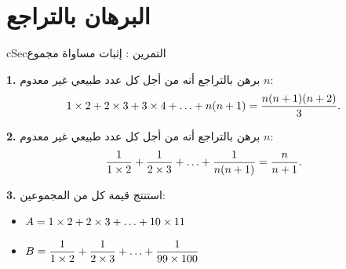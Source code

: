\documentclass[12pt,a4paper]{article}
\newenvironment{BOX}[2]{\begin{otherlanguage}{english}\begin{arbox}{#1}{#2}}{\end{arbox}\end{otherlanguage}}
\newcounter{exo}
\newenvironment{tamrin}[1]{\stepcounter{exo}\begin{BOX}{cSec}{التمرين \theexo: #1}}{\end{BOX}}
\renewcommand{\dots}{\mathinner{\ldotp\ldotp\ldotp}}
\newenvironment{sq}{\begin{itemize}[leftmargin=2.4em,itemsep=3pt]}{\end{itemize}}
\newcommand{\qa}{\item[(أ)]}\newcommand{\qb}{\item[(ب)]}\newcommand{\qc}{\item[(جـ)]}\newcommand{\qd}{\item[(د)]}\newcommand{\qe}{\item[(هـ)]}
\newcommand{\QQ}[1]{\par\smallskip\textbf{#1.} }
\begin{document}
\section{البرهان بالتراجع}

\begin{tamrin}{إثبات مساواة مجموع}
\QQ{1} برهن بالتراجع أنه من أجل كل عدد طبيعي غير معدوم $n$:
\[
1\times 2+2\times 3+3\times 4+\dots+n(n+1)=\frac{n(n+1)(n+2)}{3} .
\]
\QQ{2} برهن بالتراجع أنه من أجل كل عدد طبيعي غير معدوم $n$:
\[
\frac{1}{1\times 2}+\frac{1}{2\times 3}+\dots+\frac{1}{n(n+1)}=\frac{n}{n+1} .
\]
\QQ{3} استنتج قيمة كل من المجموعين:
\begin{sq}
\qa $A=1\times 2+2\times 3+\dots+10\times 11$
\qb $B=\dfrac{1}{1\times 2}+\dfrac{1}{2\times 3}+\dots+\dfrac{1}{99\times 100}$
\end{sq}
\end{tamrin}
\end{document}
